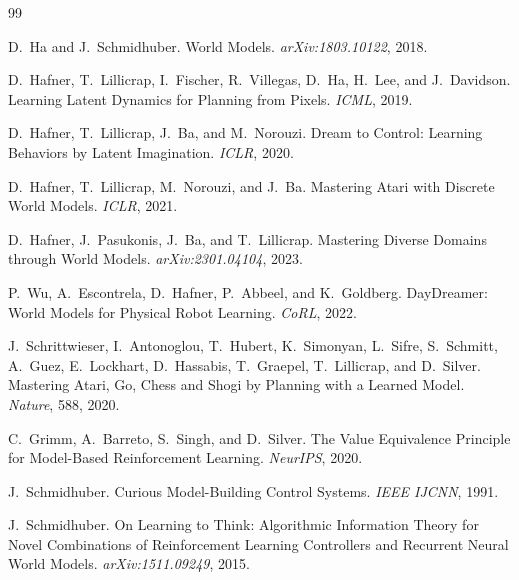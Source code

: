\documentclass[11pt,a4paper]{article}
\theoremstyle{definition}
\begin{document}
\begingroup
\renewcommand{\section}[2]{}
\begin{thebibliography}{99}

D.~Ha and J.~Schmidhuber.
\newblock World Models.
\newblock \textit{arXiv:1803.10122}, 2018.

D.~Hafner, T.~Lillicrap, I.~Fischer, R.~Villegas, D.~Ha, H.~Lee, and
  J.~Davidson.
\newblock Learning Latent Dynamics for Planning from Pixels.
\newblock \textit{ICML}, 2019.

D.~Hafner, T.~Lillicrap, J.~Ba, and M.~Norouzi.
\newblock Dream to Control: Learning Behaviors by Latent Imagination.
\newblock \textit{ICLR}, 2020.

D.~Hafner, T.~Lillicrap, M.~Norouzi, and J.~Ba.
\newblock Mastering Atari with Discrete World Models.
\newblock \textit{ICLR}, 2021.

D.~Hafner, J.~Pasukonis, J.~Ba, and T.~Lillicrap.
\newblock Mastering Diverse Domains through World Models.
\newblock \textit{arXiv:2301.04104}, 2023.

P.~Wu, A.~Escontrela, D.~Hafner, P.~Abbeel, and K.~Goldberg.
\newblock DayDreamer: World Models for Physical Robot Learning.
\newblock \textit{CoRL}, 2022.

J.~Schrittwieser, I.~Antonoglou, T.~Hubert, K.~Simonyan, L.~Sifre,
  S.~Schmitt, A.~Guez, E.~Lockhart, D.~Hassabis, T.~Graepel,
  T.~Lillicrap, and D.~Silver.
\newblock Mastering Atari, Go, Chess and Shogi by Planning with a Learned
  Model.
\newblock \textit{Nature}, 588, 2020.

C.~Grimm, A.~Barreto, S.~Singh, and D.~Silver.
\newblock The Value Equivalence Principle for Model-Based Reinforcement
  Learning.
\newblock \textit{NeurIPS}, 2020.

J.~Schmidhuber.
\newblock Curious Model-Building Control Systems.
\newblock \textit{IEEE IJCNN}, 1991.

J.~Schmidhuber.
\newblock On Learning to Think: Algorithmic Information Theory for Novel
  Combinations of Reinforcement Learning Controllers and Recurrent Neural
  World Models.
\newblock \textit{arXiv:1511.09249}, 2015.


\end{thebibliography}
\end{document}
